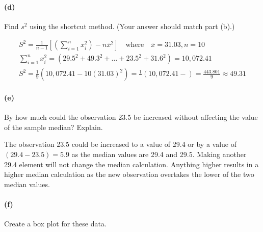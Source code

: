     \paragraph*{(d)}
    Find $s^2$ using the shortcut method. (Your answer should match part (b).)
    
    \begin{mdframed}
        \begin{equation*}
            \begin{gathered}
                S^2 = \frac{1}{n-1}\left[\left(\sum_{i=1}^{n}x_{i}^{2}\right)-n\overline{x}^{2}\right] \quad \text{where} \quad \overline{x}=31.03, n = 10 \\
                \sum_{i=1}^{n}x_{i}^{2} = (29.5^2 + 49.3^2 + \dots + 23.5^2 + 31.6^2) = 10,072.41   \\
                S^2 = \frac{1}{9}\left(10,072.41 - 10(31.03)^2\right) = \frac{1}{}\left(10,072.41 - \right)  = \frac{443.801}{9} \approx \boxed{49.31}
            \end{gathered}
        \end{equation*}
    \end{mdframed}

    \paragraph*{(e)}
    By how much could the observation 23.5 be increased without affecting the value of the sample median? Explain.
    
    \begin{mdframed}
        The observation 23.5 could be increased to a value of 29.4 or by a value of $(29.4 - 23.5) = 5.9$ as the median values are 29.4 and 29.5. Making another 29.4 element will not change the median calculation. Anything higher results in a higher median calculation as the new observation overtakes the lower of the two median values.
    \end{mdframed}

    \pagebreak

    \paragraph*{(f)}
    Create a box plot for these data.

